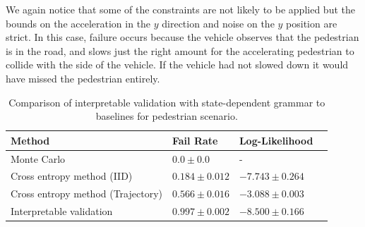 We again notice that some of the constraints are not likely to be applied but the bounds on the acceleration in the $y$ direction and noise on the $y$ position are strict. In this case, failure occurs because the vehicle observes that the pedestrian is in the road, and slows just the right amount for the accelerating pedestrian to collide with the side of the vehicle. If the vehicle had not slowed down it would have missed the pedestrian entirely.
\begin{table}
    \centering
    \caption{Comparison of interpretable validation with state-dependent grammar to baselines for pedestrian scenario.}
    \label{tab:ped_results_state_dependent}
    \begin{tabular}{@{}llll@{}} 
        \toprule
        \textbf{Method} & \textbf{Fail Rate} & \textbf{Log-Likelihood} \\
        \midrule
        Monte Carlo & $0.0 \pm 0.0$ &  -   \\
        Cross entropy method (IID) & $0.184 \pm 0.012$ & $-7.743 \pm 0.264$\\
        Cross entropy method (Trajectory) & $0.566 \pm 0.016$ & $-3.088 \pm 0.003$ \\
        Interpretable validation & $0.997 \pm 0.002$ & $-8.500 \pm 0.166$ \\
        \bottomrule
    \end{tabular}
\end{table}


